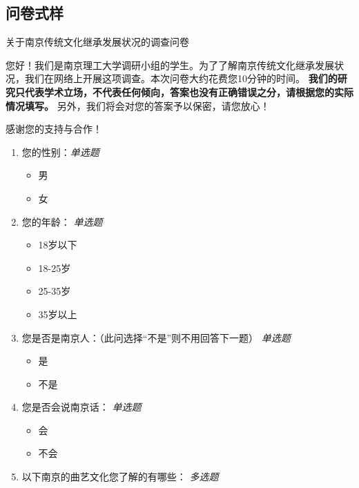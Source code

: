 \documentclass[12pt]{article}%
\begin{document}
\subsection{问卷式样}

\begin{center}
  \large 关于南京传统文化继承发展状况的调查问卷
\end{center}
\small

    您好！我们是南京理工大学调研小组的学生。为了了解南京传统文化继承发展状况，我们在网络上开展这项调查。本次问卷大约花费您10分钟的时间。\textbf{ 我们的研究只代表学术立场，不代表任何倾向，答案也没有正确错误之分，请根据您的实际情况填写。}
    另外，我们将会对您的答案予以保密，请您放心！

     感谢您的支持与合作！
     \begin{enumerate}
       \item 您的性别：\emph{单选题}
       \begin{itemize}
         \item 男
         \item 女
       \end{itemize}
       \item 您的年龄： \emph{单选题}
       \begin{itemize}
         \item 18岁以下
         \item 18-25岁
         \item 25-35岁
         \item 35岁以上
       \end{itemize}
       \item 您是否是南京人：（此问选择“不是”则不用回答下一题） \emph{单选题}
       \begin{itemize}
         \item 是
         \item 不是
       \end{itemize}
       \item 您是否会说南京话： \emph{单选题}
       \begin{itemize}
         \item 会
         \item 不会
       \end{itemize}
       \item 以下南京的曲艺文化您了解的有哪些： \emph{多选题}
\end{enumerate}
\end{document}

